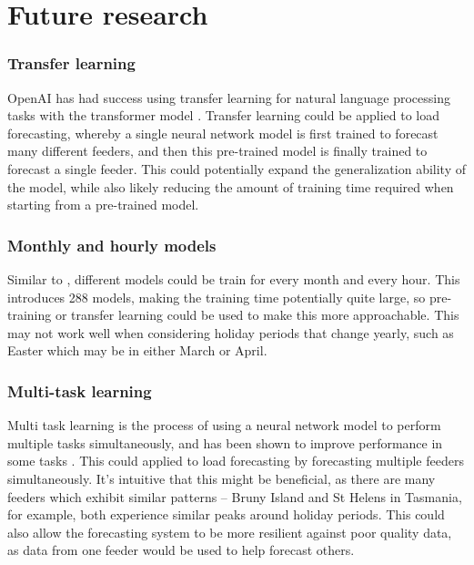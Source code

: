 \section{Future research}

\subsubsection{Transfer learning}
OpenAI has had success using transfer learning for natural language processing tasks with the transformer model \cite{radford2018improving}.
Transfer learning could be applied to load forecasting, whereby a single neural network model is first trained to forecast many different feeders, and then this pre-trained model is finally trained to forecast a single feeder.
This could potentially expand the generalization ability of the model, while also likely reducing the amount of training time required when starting from a pre-trained model.

\subsubsection{Monthly and hourly models}
Similar to \citet{Ceperic2013}, different models could be train for every month and every hour.
This introduces 288 models, making the training time potentially quite large, so pre-training or transfer learning could be used to make this more approachable.
This may not work well when considering holiday periods that change yearly, such as Easter which may be in either March or April.

\subsubsection{Multi-task learning}
Multi task learning is the process of using a neural network model to perform multiple tasks simultaneously, and has been shown to improve performance in some tasks \cite{Evgeniou2004}.
This could applied to load forecasting by forecasting multiple feeders simultaneously.
It's intuitive that this might be beneficial, as there are many feeders which exhibit similar patterns -- Bruny Island and St Helens in Tasmania, for example, both experience similar peaks around holiday periods.
This could also allow the forecasting system to be more resilient against poor quality data, as data from one feeder would be used to help forecast others.

